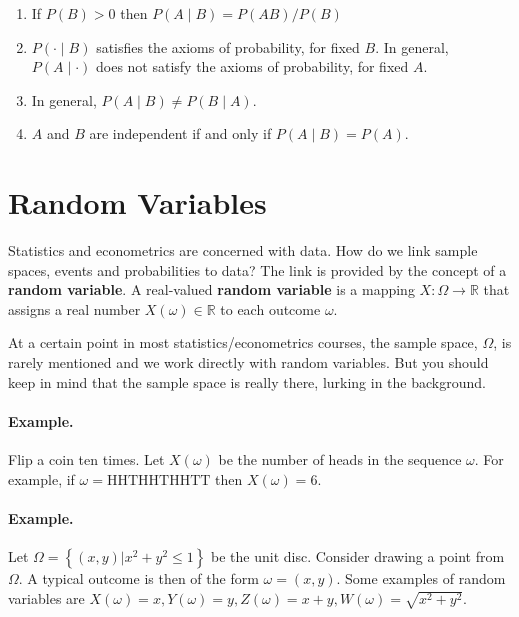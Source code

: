 \documentclass[
  14pt,
]{memoir}
\providecommand{\tightlist}{%
  \setlength{\itemsep}{0pt}\setlength{\parskip}{0pt}}
\begin{document}
\begin{enumerate}
\def\labelenumi{\arabic{enumi}.}
\tightlist
\item
  If \(P(B)>0\) then \(P(A \mid B)=P(A B)/P(B)\)
\item
  \(P(\cdot \mid B)\) satisfies the axioms of probability, for fixed \(B\). In general, \(P(A \mid \cdot)\) does not satisfy the axioms of probability, for fixed \(A\).
\item
  In general, \(P(A \mid B) \neq P(B \mid A)\).
\item
  \(A\) and \(B\) are independent if and only if \(P(A \mid B)=P(A)\).
\end{enumerate}

\hypertarget{random-variables}{%
\section{Random Variables}\label{random-variables}}

Statistics and econometrics are concerned with data. How do we link sample spaces, events and probabilities to data? The link is provided by the concept of a \textbf{random variable}. A real-valued \textbf{random variable} is a mapping \(X: \Omega \rightarrow \mathbb{R}\) that assigns a real number \(X(\omega)\in\mathbb{R}\) to each outcome \(\omega\).

\bigskip

At a certain point in most statistics/econometrics courses, the sample space, \(\Omega\), is rarely mentioned and we work directly with random variables. But you should keep in mind that the sample space is really there, lurking in the background.

\bigskip

\paragraph*{Example.}

Flip a coin ten times. Let \(X(\omega)\) be the number of heads in the sequence \(\omega.\) For example, if \(\omega=\text{HHTHHTHHTT}\) then \(X(\omega)=6\).

\bigskip

\paragraph*{Example.}

Let \(\Omega=\left\{(x, y)|x^{2}+y^{2} \leq 1\right\}\) be the unit disc. Consider drawing a point  from \(\Omega\). A typical outcome is then of the form \(\omega=(x, y) .\) Some examples of random variables are \(X(\omega)=x, Y(\omega)=y, Z(\omega)=x+y, W(\omega)=\sqrt{x^{2}+y^{2}}\).
\end{document}
